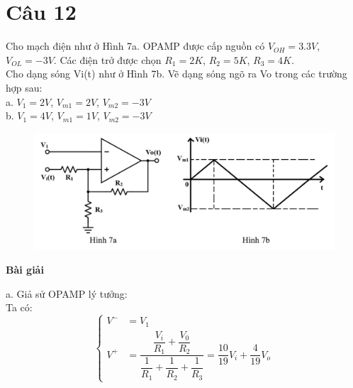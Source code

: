 \section{Câu 12}
Cho mạch điện như ở Hình 7a. OPAMP được cấp nguồn có $V_{OH}=3.3V$, $V_{OL}=-3V$.
Các điện trở được chọn $R_1=2K$, $R_2=5K$, $R_3=4K$.\\
Cho dạng sóng Vi(t) như ở Hình 7b. Vẽ dạng sóng ngõ ra Vo trong các trường hợp sau:\\
a. $V_1=2V$, $V_{m1}=2V$, $V_{m2}=-3V$\\
b. $V_1=4V$, $V_{m1}=1V$, $V_{m2}=-3V$
\begin{figure}[H]
	\centering
	\includegraphics[scale=0.6]{image/C12_De.png}
\end{figure}
\begin{center}
\textbf{Bài giải}
\end{center}
a. Giả sử OPAMP lý tưởng:\\
Ta có:
\[
\left\{
\begin{aligned}
V^- &= V_1 \\
V^+ &= \dfrac{\dfrac{V_i}{R_1} + \dfrac{V_0}{R_2}}{\dfrac{1}{R_1} + \dfrac{1}{R_2} + \dfrac{1}{R_3}} = \dfrac{10}{19}V_i +\dfrac{4}{19}V_o
\end{aligned}
\right.
\]


